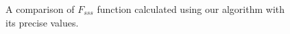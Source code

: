\documentclass[reprint,amsmath,amssymb,aps,pre,showkeys,showpacs]{revtex4-1}
\begin{document}
\begin{figure}[tp]
{    \label{fig:sss-dumbbell-precise}}
  \hfill
  \caption[]{A comparison of $F_{sss}$ function calculated using our algorithm
    with its precise values.}
  \label{fig:sss-verification}
\end{figure}
\end{document}
